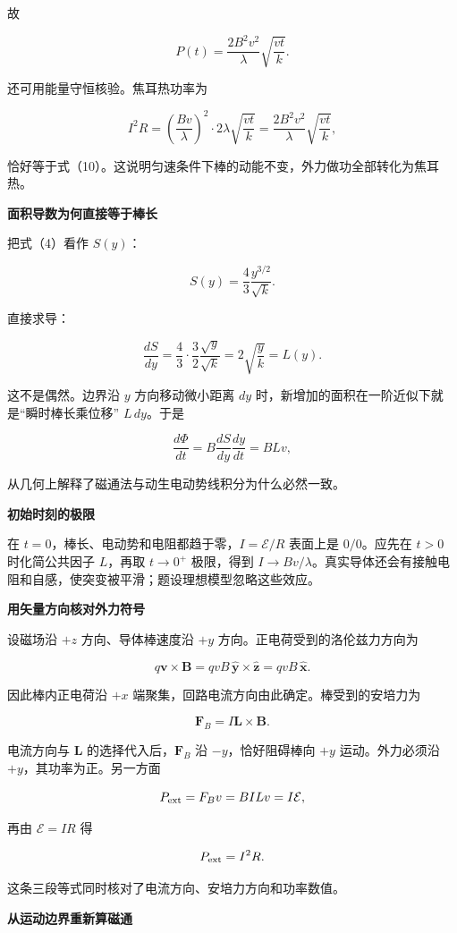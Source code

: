 \documentclass[12pt,a4paper,UTF8]{ctexart}
\begin{document}
故

\[
\boxed{P(t)=\frac{2B^2v^2}{\lambda}\sqrt{\frac{vt}{k}}}.
\tag{10}
\]

还可用能量守恒核验。焦耳热功率为

\[
I^2R
=\left(\frac{Bv}{\lambda}\right)^2
\cdot2\lambda\sqrt{\frac{vt}{k}}
=\frac{2B^2v^2}{\lambda}\sqrt{\frac{vt}{k}},
\]

恰好等于式（10）。这说明匀速条件下棒的动能不变，外力做功全部转化为焦耳热。

\textbf{面积导数为何直接等于棒长}

把式（4）看作 \(S(y)\)：

\[
S(y)=\frac43\frac{y^{3/2}}{\sqrt k}.
\]

直接求导：

\[
\frac{dS}{dy}
=\frac43\cdot\frac32\frac{\sqrt y}{\sqrt k}
=2\sqrt{\frac yk}
=L(y).
\]

这不是偶然。边界沿 \(y\) 方向移动微小距离 \(dy\)
时，新增加的面积在一阶近似下就是``瞬时棒长乘位移'' \(L\,dy\)。于是

\[
\frac{d\Phi}{dt}
=B\frac{dS}{dy}\frac{dy}{dt}
=BLv,
\]

从几何上解释了磁通法与动生电动势线积分为什么必然一致。

\textbf{初始时刻的极限}

在 \(t=0\)，棒长、电动势和电阻都趋于零，\(I=\mathcal E/R\) 表面上是
\(0/0\)。应先在 \(t>0\) 时化简公共因子 \(L\)，再取 \(t\to0^+\)
极限，得到
\(I\to Bv/\lambda\)。真实导体还会有接触电阻和自感，使突变被平滑；题设理想模型忽略这些效应。

\textbf{用矢量方向核对外力符号}

设磁场沿 \(+z\) 方向、导体棒速度沿 \(+y\)
方向。正电荷受到的洛伦兹力方向为

\[
q\bm v\times\bm B
=qvB\,\hat{\bm y}\times\hat{\bm z}
=qvB\,\hat{\bm x}.
\]

因此棒内正电荷沿 \(+x\) 端聚集，回路电流方向由此确定。棒受到的安培力为

\[
\bm F_B=I\bm L\times\bm B.
\]

电流方向与 \(\bm L\) 的选择代入后，\(\bm F_B\) 沿 \(-y\)，恰好阻碍棒向
\(+y\) 运动。外力必须沿 \(+y\)，其功率为正。另一方面

\[
P_{\rm ext}=F_Bv=BILv=I\mathcal E,
\]

再由 \(\mathcal E=IR\) 得

\[
P_{\rm ext}=I^2R.
\]

这条三段等式同时核对了电流方向、安培力方向和功率数值。

\textbf{从运动边界重新算磁通}
\end{document}
